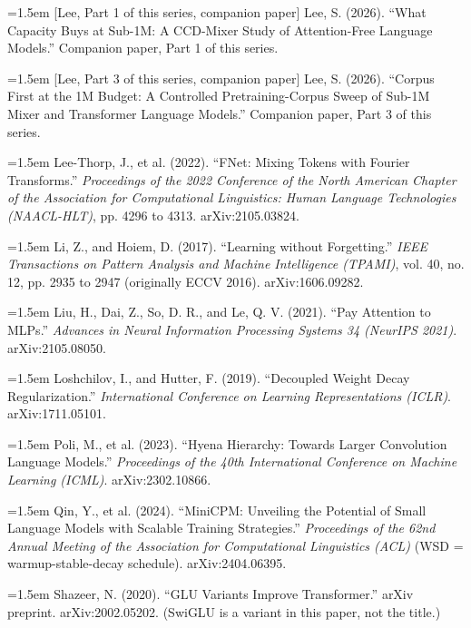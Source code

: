 \documentclass[11pt]{article}
\begin{document}
\par\hangindent=1.5em [Lee, Part 1 of this series, companion paper] Lee, S. (2026). ``What Capacity Buys at Sub-1M: A CCD-Mixer Study of Attention-Free Language Models.'' Companion paper, Part 1 of this series.

\par\hangindent=1.5em [Lee, Part 3 of this series, companion paper] Lee, S. (2026). ``Corpus First at the 1M Budget: A Controlled Pretraining-Corpus Sweep of Sub-1M Mixer and Transformer Language Models.'' Companion paper, Part 3 of this series.

\par\hangindent=1.5em Lee-Thorp, J., et al. (2022). ``FNet: Mixing Tokens with Fourier Transforms.'' \emph{Proceedings of the 2022 Conference of the North American Chapter of the Association for Computational Linguistics: Human Language Technologies (NAACL-HLT)}, pp. 4296 to 4313. arXiv:2105.03824.

\par\hangindent=1.5em Li, Z., and Hoiem, D. (2017). ``Learning without Forgetting.'' \emph{IEEE Transactions on Pattern Analysis and Machine Intelligence (TPAMI)}, vol. 40, no. 12, pp. 2935 to 2947 (originally ECCV 2016). arXiv:1606.09282.

\par\hangindent=1.5em Liu, H., Dai, Z., So, D. R., and Le, Q. V. (2021). ``Pay Attention to MLPs.'' \emph{Advances in Neural Information Processing Systems 34 (NeurIPS 2021)}. arXiv:2105.08050.

\par\hangindent=1.5em Loshchilov, I., and Hutter, F. (2019). ``Decoupled Weight Decay Regularization.'' \emph{International Conference on Learning Representations (ICLR)}. arXiv:1711.05101.

\par\hangindent=1.5em Poli, M., et al. (2023). ``Hyena Hierarchy: Towards Larger Convolution Language Models.'' \emph{Proceedings of the 40th International Conference on Machine Learning (ICML)}. arXiv:2302.10866.

\par\hangindent=1.5em Qin, Y., et al. (2024). ``MiniCPM: Unveiling the Potential of Small Language Models with Scalable Training Strategies.'' \emph{Proceedings of the 62nd Annual Meeting of the Association for Computational Linguistics (ACL)} (WSD = warmup-stable-decay schedule). arXiv:2404.06395.

\par\hangindent=1.5em Shazeer, N. (2020). ``GLU Variants Improve Transformer.'' arXiv preprint. arXiv:2002.05202. (SwiGLU is a variant in this paper, not the title.)
\end{document}
